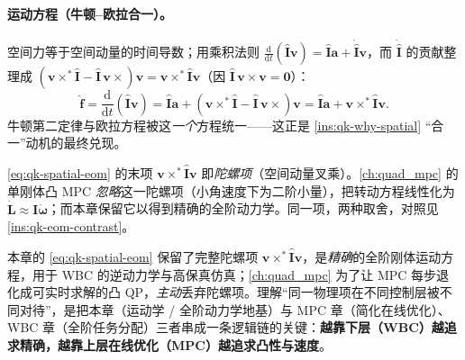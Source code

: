 \paragraph{运动方程（牛顿--欧拉合一）。}
空间力等于空间动量的时间导数；用乘积法则 $\tfrac{\mathrm d}{\mathrm dt}(\hat{\mathbf{I}}\boldsymbol{v})=\hat{\mathbf{I}}\boldsymbol{a}+\dot{\hat{\mathbf{I}}}\boldsymbol{v}$，而 $\dot{\hat{\mathbf{I}}}$ 的贡献整理成 $(\boldsymbol{v}\times^{*}\hat{\mathbf{I}}-\hat{\mathbf{I}}\,\boldsymbol{v}\times)\boldsymbol{v}=\boldsymbol{v}\times^{*}\hat{\mathbf{I}}\boldsymbol{v}$（因 $\hat{\mathbf{I}}\,\boldsymbol{v}\times\boldsymbol{v}=\mathbf{0}$）\cite{yu2021quadruped}：
\begin{equation}
  \hat{\boldsymbol{f}}=\frac{\mathrm{d}}{\mathrm{d}t}(\hat{\mathbf{I}}\boldsymbol{v})
  =\hat{\mathbf{I}}\boldsymbol{a}+(\boldsymbol{v}\times^{*}\hat{\mathbf{I}}-\hat{\mathbf{I}}\,\boldsymbol{v}\times)\boldsymbol{v}
  =\hat{\mathbf{I}}\boldsymbol{a}+\boldsymbol{v}\times^{*}\hat{\mathbf{I}}\boldsymbol{v}.
  \label{eq:qk-spatial-eom}
\end{equation}
牛顿第二定律与欧拉方程被这\emph{一个}方程统一——这正是 \cref{ins:qk-why-spatial} “合一”动机的最终兑现。

\begin{note}[陀螺项的跨章对照]\label{note:qk-ocr-eom}
\cref{eq:qk-spatial-eom} 的末项 $\boldsymbol{v}\times^{*}\hat{\mathbf{I}}\boldsymbol{v}$ 即\emph{陀螺项}（空间动量叉乘）。\cref{ch:quad_mpc} 的单刚体凸 MPC \emph{忽略}这一陀螺项（小角速度下为二阶小量），把转动方程线性化为 $\dot{\boldsymbol{L}}\approx\mathbf{I}\dot{\boldsymbol{\omega}}$；而本章保留它以得到精确的全阶动力学。同一项，两种取舍，对照见 \cref{ins:qk-eom-contrast}。
\end{note}

\begin{insight}\label{ins:qk-eom-contrast}
本章的 \cref{eq:qk-spatial-eom} 保留了完整陀螺项 $\boldsymbol{v}\times^{*}\hat{\mathbf{I}}\boldsymbol{v}$，是\emph{精确}的全阶刚体运动方程，用于 WBC 的逆动力学与高保真仿真；\cref{ch:quad_mpc} 为了让 MPC 每步退化成可实时求解的凸 QP，\emph{主动}丢弃陀螺项。理解“同一物理项在不同控制层被不同对待”，是把本章（运动学 / 全阶动力学地基）与 MPC 章（简化在线优化）、WBC 章（全阶任务分配）三者串成一条逻辑链的关键：\textbf{越靠下层（WBC）越追求精确，越靠上层在线优化（MPC）越追求凸性与速度}。
\end{insight}

